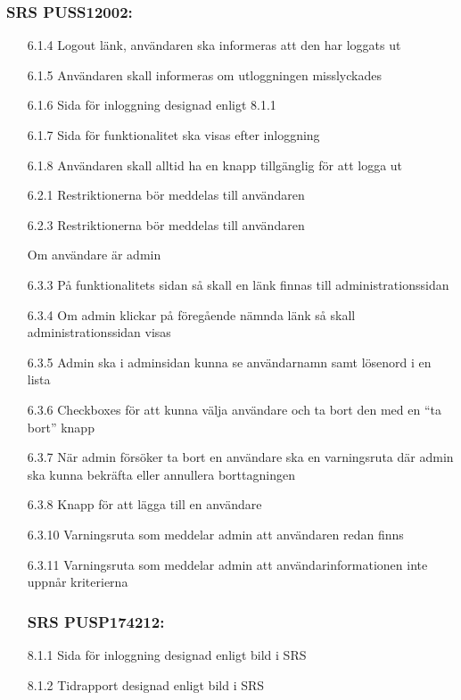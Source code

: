 \documentclass[paper=a4, fontsize=11pt,twoside]{article}
\begin{document}
\subsubsection{SRS PUSS12002:}
\begin{itemize}
\item[6.1.4] Logout länk, användaren ska informeras att den har loggats ut
\item[6.1.5] Användaren skall informeras om utloggningen misslyckades
\item[6.1.6] Sida för inloggning designad enligt 8.1.1
\item[6.1.7] Sida för funktionalitet ska visas efter inloggning
\item[6.1.8] Användaren skall alltid ha en knapp tillgänglig för att logga ut

\item[6.2.1] Restriktionerna bör meddelas till användaren
\item[6.2.3] Restriktionerna bör meddelas till användaren

Om användare är admin
\item[6.3.3] På funktionalitets sidan så skall en länk finnas till administrationssidan 
\item[6.3.4] Om admin klickar på föregående nämnda länk så skall administrationssidan visas
\item[6.3.5] Admin ska i adminsidan kunna se användarnamn samt lösenord i en lista
\item[6.3.6] Checkboxes för att kunna välja användare och ta bort den med en “ta bort” knapp
\item[6.3.7] När admin försöker ta bort en användare ska en varningsruta där admin ska kunna bekräfta eller annullera borttagningen
\item[6.3.8] Knapp för att lägga till en användare
\item[6.3.10] Varningsruta som meddelar admin att användaren redan finns
\item[6.3.11] Varningsruta som meddelar admin att användarinformationen inte uppnår kriterierna

\subsubsection{SRS PUSP174212:}
\item[8.1.1] Sida för inloggning designad enligt bild i SRS
\item[8.1.2] Tidrapport designad enligt bild i SRS


\end{itemize}
\end{document}
